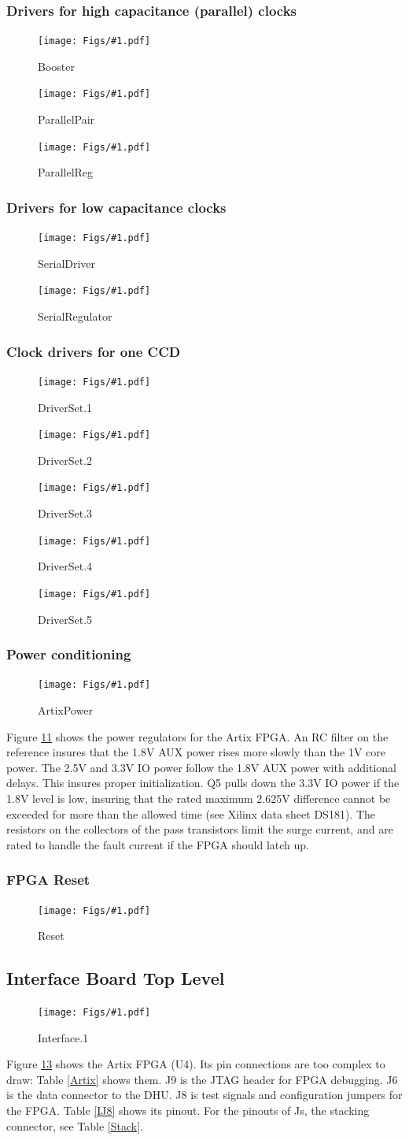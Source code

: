 \documentclass[12pt]{article}
\let\oldsubsection\subsection
\renewcommand{\subsection}{\FloatBarrier\oldsubsection}
\let\oldsubsubsection\subsubsection
\renewcommand{\subsubsection}{\FloatBarrier\oldsubsubsection}
\newcommand{\schempage}[1]{
   \begin{center}
\begin{figure}[ht!]
   \centerline{\texttt{[image: Figs/\#1.pdf]}}
    \caption{#1}
    \label{#1}
    \end{figure}
\end{center}
}
\begin{document}
\subsubsection{Drivers for high capacitance (parallel) clocks}
\schempage{Booster}
\schempage{ParallelPair}
\schempage{ParallelReg}
\subsubsection{Drivers for low capacitance clocks}
\schempage{SerialDriver}
\schempage{SerialRegulator}
\subsubsection{Clock drivers for one CCD}
\schempage{DriverSet.1}
\schempage{DriverSet.2}
\schempage{DriverSet.3}
\schempage{DriverSet.4}
\schempage{DriverSet.5}
\subsubsection{Power conditioning}
\schempage{ArtixPower}

Figure \ref{ArtixPower} shows the power regulators for the Artix FPGA. An RC filter on the reference insures that the 1.8V AUX power rises more slowly than the 1V core power. The 2.5V and 3.3V IO power follow the 1.8V AUX power with additional delays. This insures proper initialization. Q5 pulls down the 3.3V IO power if the 1.8V level is low, insuring that the rated maximum 2.625V difference cannot be exceeded for more than the allowed time (see Xilinx data sheet DS181). The resistors on the collectors of the pass transistors limit the surge current, and are rated to handle the fault current if the FPGA should latch up. 
\subsubsection{FPGA Reset}
\schempage{Reset}
\subsection{Interface Board Top Level}
\schempage{Interface.1}
Figure \ref{Interface.1} shows the Artix FPGA (U4). Its pin connections are too complex to draw: Table \ref{Artix} shows them. J9 is the JTAG header for FPGA debugging. J6 is the data connector to the DHU. J8 is test signals and configuration jumpers for the FPGA. Table \ref{IJ8} shows its pinout. For the pinouts of Js, the stacking connector, see Table \ref{Stack}.
\end{document}
